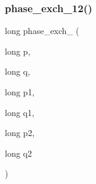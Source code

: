 \mbox{\label{adat-devel_2lib_2SU3_2reps_8cc_aa2fc81838328560e24ea8a4c4d4c02be}} 
\subsubsection{\texorpdfstring{phase\_exch\_12()}{phase\_exch\_12()}}
{\footnotesize\ttfamily long phase\+\_\+exch\+\_ (\begin{DoxyParamCaption}\item[{long}]{p,  }\item[{long}]{q,  }\item[{long}]{p1,  }\item[{long}]{q1,  }\item[{long}]{p2,  }\item[{long}]{q2 }\end{DoxyParamCaption})}

